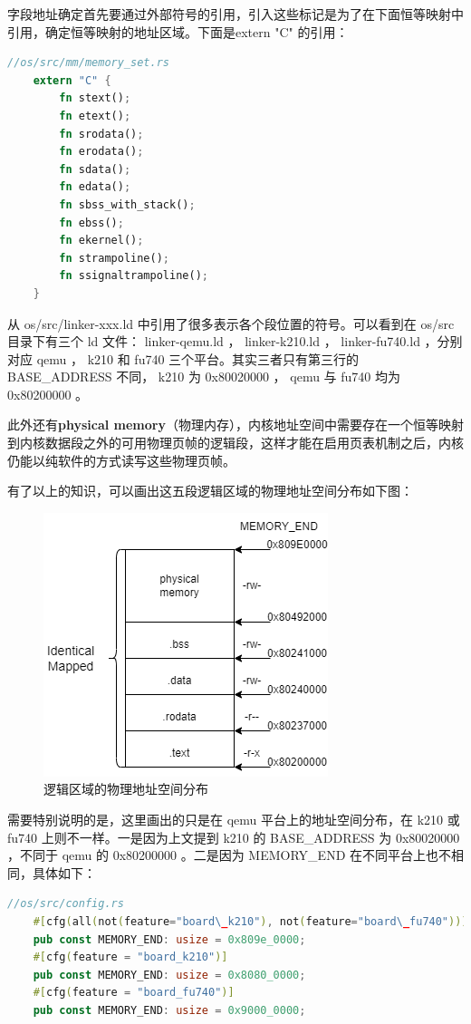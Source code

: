 字段地址确定首先要通过外部符号的引用，引入这些标记是为了在下面恒等映射中引用，确定恒等映射的地址区域。下面是extern "C" 的引用：
\begin{lstlisting}[language={Rust}, label={code:extern "C"},
	caption={extern "C"}]
	//os/src/mm/memory_set.rs
	extern "C" {
		fn stext();
		fn etext();
		fn srodata();
		fn erodata();
		fn sdata();
		fn edata();
		fn sbss_with_stack();
		fn ebss();
		fn ekernel();
		fn strampoline();
		fn ssignaltrampoline();
	}
\end{lstlisting}
从 os/src/linker-xxx.ld 中引用了很多表示各个段位置的符号。可以看到在 os/src 目录下有三个 ld 文件： linker-qemu.ld ， linker-k210.ld ， linker-fu740.ld ，分别对应 qemu ， k210 和 fu740 三个平台。其实三者只有第三行的 BASE\_ADDRESS 不同， k210 为 0x80020000 ， qemu 与 fu740 均为 0x80200000 。

此外还有\textbf{physical memory}（物理内存），内核地址空间中需要存在一个恒等映射到内核数据段之外的可用物理页帧的逻辑段，这样才能在启用页表机制之后，内核仍能以纯软件的方式读写这些物理页帧。

有了以上的知识，可以画出这五段逻辑区域的物理地址空间分布如下图：
\begin{figure}[htb]
	\centering
	\includegraphics[width=0.5\linewidth]{figures/04-02-逻辑区域的物理地址空间.png}
	\caption{
		逻辑区域的物理地址空间分布
	}
	\label{fig:逻辑区域的物理地址空间分布}
\end{figure}


需要特别说明的是，这里画出的只是在 qemu 平台上的地址空间分布，在 k210 或 fu740 上则不一样。一是因为上⽂提到 k210 的 BASE\_ADDRESS 为 0x80020000 ，不同于 qemu 的 0x80200000 。二是因为 MEMORY\_END 在不同平台上也不相同，具体如下：
\begin{lstlisting}[language={Rust}, label={code:config},caption={config.rs}]
	//os/src/config.rs
	#[cfg(all(not(feature="board\_k210"), not(feature="board\_fu740")))]
	pub const MEMORY_END: usize = 0x809e_0000;
	#[cfg(feature = "board_k210")]
	pub const MEMORY_END: usize = 0x8080_0000;
	#[cfg(feature = "board_fu740")]
	pub const MEMORY_END: usize = 0x9000_0000;
\end{lstlisting}

